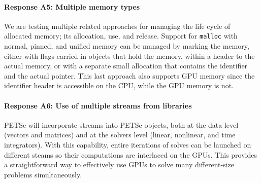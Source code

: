 \documentclass[5p,times]{elsarticle}
\begin{document}
\paragraph{Response A5: Multiple memory types}

We are testing multiple related approaches for managing the life cycle of
allocated memory; its allocation, use, and release. Support for {\tt malloc} with normal,
pinned, and unified memory can be managed by marking the memory, either with flags carried in objects that hold the memory, 
within a header to the actual memory, or with a separate small allocation that contains the identifier and the actual pointer. This last approach also supports GPU memory since the identifier header
is accessible on the CPU, while the GPU memory is not.


\paragraph{Response A6: Use of multiple streams from libraries}
PETSc will incorporate streams into PETSc objects, both at the data level (vectors and matrices) and at the solvers level (linear, nonlinear, and time integrators). With this capability, entire iterations of 
solves can be launched on different steams so their computations are interlaced on the GPUs.  This provides a straightforward way to effectively use GPUs to solve many different-size problems simultaneously.



\end{document}
